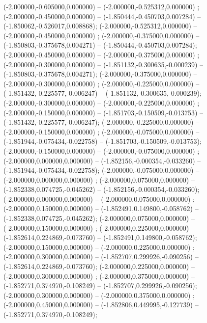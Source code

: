  (-2.000000,-0.605000,0.000000) -- (-2.000000,-0.525312,0.000000) ;
 (-2.000000,-0.450000,0.000000) -- (-1.850444,-0.450703,0.007284) -- (-1.850062,-0.526017,0.008868);
 (-2.000000,-0.525312,0.000000) -- (-2.000000,-0.450000,0.000000) ;
 (-2.000000,-0.375000,0.000000) -- (-1.850803,-0.375678,0.004271) -- (-1.850444,-0.450703,0.007284);
 (-2.000000,-0.450000,0.000000) -- (-2.000000,-0.375000,0.000000) ;
 (-2.000000,-0.300000,0.000000) -- (-1.851132,-0.300635,-0.000239) -- (-1.850803,-0.375678,0.004271);
 (-2.000000,-0.375000,0.000000) -- (-2.000000,-0.300000,0.000000) ;
 (-2.000000,-0.225000,0.000000) -- (-1.851432,-0.225577,-0.006247) -- (-1.851132,-0.300635,-0.000239);
 (-2.000000,-0.300000,0.000000) -- (-2.000000,-0.225000,0.000000) ;
 (-2.000000,-0.150000,0.000000) -- (-1.851703,-0.150509,-0.013753) -- (-1.851432,-0.225577,-0.006247);
 (-2.000000,-0.225000,0.000000) -- (-2.000000,-0.150000,0.000000) ;
 (-2.000000,-0.075000,0.000000) -- (-1.851944,-0.075434,-0.022758) -- (-1.851703,-0.150509,-0.013753);
 (-2.000000,-0.150000,0.000000) -- (-2.000000,-0.075000,0.000000) ;
 (-2.000000,0.000000,0.000000) -- (-1.852156,-0.000354,-0.033260) -- (-1.851944,-0.075434,-0.022758);
 (-2.000000,-0.075000,0.000000) -- (-2.000000,0.000000,0.000000) ;
 (-2.000000,0.075000,0.000000) -- (-1.852338,0.074725,-0.045262) -- (-1.852156,-0.000354,-0.033260);
 (-2.000000,0.000000,0.000000) -- (-2.000000,0.075000,0.000000) ;
 (-2.000000,0.150000,0.000000) -- (-1.852491,0.149800,-0.058762) -- (-1.852338,0.074725,-0.045262);
 (-2.000000,0.075000,0.000000) -- (-2.000000,0.150000,0.000000) ;
 (-2.000000,0.225000,0.000000) -- (-1.852614,0.224869,-0.073760) -- (-1.852491,0.149800,-0.058762);
 (-2.000000,0.150000,0.000000) -- (-2.000000,0.225000,0.000000) ;
 (-2.000000,0.300000,0.000000) -- (-1.852707,0.299926,-0.090256) -- (-1.852614,0.224869,-0.073760);
 (-2.000000,0.225000,0.000000) -- (-2.000000,0.300000,0.000000) ;
 (-2.000000,0.375000,0.000000) -- (-1.852771,0.374970,-0.108249) -- (-1.852707,0.299926,-0.090256);
 (-2.000000,0.300000,0.000000) -- (-2.000000,0.375000,0.000000) ;
 (-2.000000,0.450000,0.000000) -- (-1.852806,0.449995,-0.127739) -- (-1.852771,0.374970,-0.108249);

